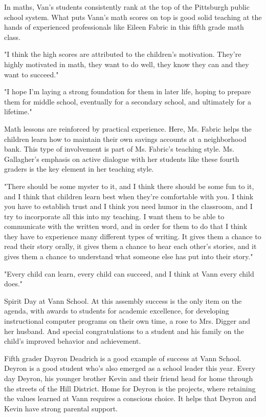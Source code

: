 In maths, Van's students consistently rank at the top of the Pittsburgh public school system. What puts Vann's math scores on top is good solid teaching at the hands of experienced professionals like Eileen Fabric in this fifth grade math class.

"I think the high scores are attributed to the children's motivation. They're highly motivated in math, they want to do well, they know they can and they want to succeed."

"I hope I'm laying a strong foundation for them in later life, hoping to prepare them for middle school, eventually for a secondary school, and ultimately for a lifetime."

Math lessons are reinforced by practical experience. Here, Ms. Fabric helps the children learn how to maintain their own savings accounts at a neighborhood bank. This type of involvement is part of Ms. Fabric's teaching style. Ms. Gallagher's emphasis on active dialogue with her students like these fourth graders is the key element in her teaching style.

"There should be some myster to it, and I think there should be some fun to it, and I think that children learn best when they're comfortable with you. I think you have to establish trust and I think you need humor in the classroom, and I try to incorporate all this into my teaching. I want them to be able to communicate with the written word, and in order for them to do that I think they have to experience many different types of writing. It gives them a chance to read their story orally, it gives them a chance to hear each other's stories, and it gives them a chance to understand what someone else has put into their story."

"Every child can learn, every child can succeed, and I think at Vann every child does."

Spirit Day at Vann School. At this assembly success is the only item on the agenda, with awards to students for academic excellence, for developing instructional computer programs on their own time, a rose to Mrs. Digger and her husband. And special congratulations to a student and his family on the child's improved behavior and achievement.

Fifth grader Dayron Deadrich is a good example of success at Vann School. Deyron is a good student who's also emerged as a school leader this year. Every day Deyron, his younger brother Kevin and their friend head for home through the streets of the Hill District. Home for Deyron is the projects, where retaining the values learned at Vann requires a conscious choice. It helps that Deyron and Kevin have strong parental support.

